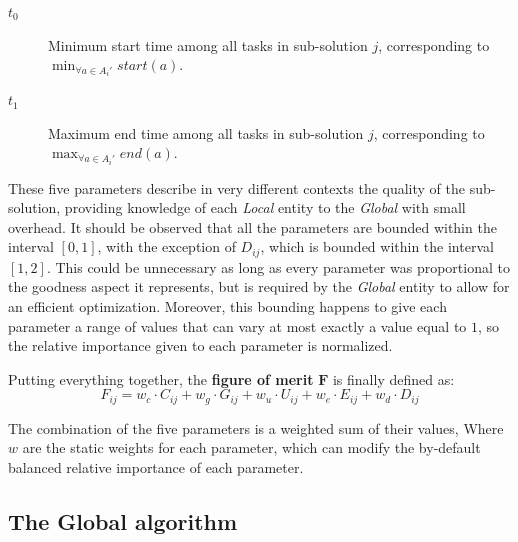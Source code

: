 \begin{description}
\item[$t_0$] Minimum start time among all tasks in sub-solution $j$, corresponding to $\min_{\forall a \in A_i'}{start(a)}$.
\item[$t_1$] Maximum end time among all tasks in sub-solution $j$, corresponding to $\max_{\forall a \in A_i'}{end(a)}$.
\end{description}

These five parameters describe in very different contexts the quality of the sub-solution, providing knowledge of each \emph{Local} entity to the \emph{Global} with small overhead. It should be observed that 	all the parameters are bounded within the interval $\left[0,1\right]$, with the exception of $D_{ij}$, which is bounded within the interval $\left[1,2\right]$. This could be unnecessary as long as every parameter was proportional to the goodness aspect it represents, but is required by the \emph{Global} entity to allow for an efficient optimization. Moreover, this bounding happens to give each parameter a range of values that can vary at most exactly a value equal to $1$, so the relative importance given to each parameter is normalized.

Putting everything together, the \textbf{figure of merit} $\mathbf{F}$ is finally defined as:
\begin{equation}
\label{eq_F_weighted}
F_{ij} = w_c\cdot C_{ij} + w_g\cdot G_{ij} + w_u\cdot U_{ij} + w_e\cdot E_{ij} + w_d\cdot D_{ij} 
\end{equation}

The combination of the five parameters is a weighted sum of their values, Where $w$ are the static weights for each parameter, which can modify the by-default balanced relative importance of each parameter.


\subsection{The Global algorithm}
\label{sec_LG_optimizations}

